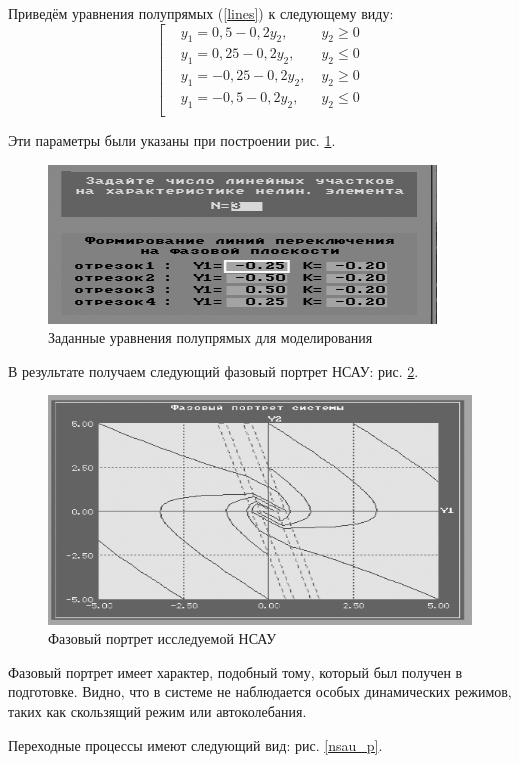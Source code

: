 	Приведём уравнения полупрямых (\ref{lines}) к следующему виду:
	\begin{equation*}
		\left[
		\begin{aligned}
			&y_1 = 0,5 - 0,2y_2,\;&y_2 \geq 0 \\
			&y_1 = 0,25 - 0,2y_2,\;&y_2 \leq 0 \\
			&y_1 = -0,25 - 0,2y_2,\;&y_2 \geq 0 \\
			&y_1 = -0,5 - 0,2y_2,\;&y_2 \leq 0 \\
		\end{aligned}\right.
	\end{equation*}

	Эти параметры были указаны при построении рис. \ref{lines_p}.
	
	\begin{figure}[h]
		\centering\includegraphics[width=.4\textwidth]{png/9.png}
		\caption{Заданные уравнения полупрямых для моделирования}
		\label{lines_p}
	\end{figure}

	В результате получаем следующий фазовый портрет НСАУ: рис. \ref{NSAU_portret}.
	
	\begin{figure}[h]
		\centering\includegraphics[width=.7\textwidth]{png/11.png}
		\caption{Фазовый портрет исследуемой НСАУ}
		\label{NSAU_portret}
	\end{figure}
	
	Фазовый портрет имеет характер, подобный тому, который был получен в подготовке. Видно, что в системе не наблюдается особых динамических режимов, таких как скользящий режим или автоколебания.
	
	Переходные процессы имеют следующий вид: рис. \ref{nsau_p}.
	
